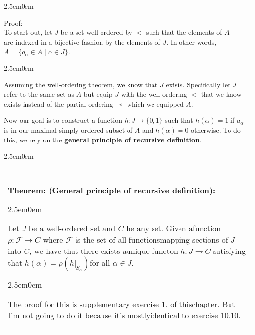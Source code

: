 \documentclass{book}
\newcommand{\hTwo}{%
\color{Black}%
   \fontsize{13}{15}\selectfont%
}
\newcommand{\myComment}{%
   \color{RawerSienna}%
   \fontsize{12}{14}\selectfont%
}
\newenvironment{myIndent}{%
   \begin{adjustwidth}{2.5em}{0em}%
}{%
   \end{adjustwidth}%
}
\newenvironment{myClosureOne}[2][.]{%
   \color{#1}%
   \begin{tabular}{|p{#2in}|} \hline \\%
}{%
   \\ \hline \end{tabular}%
}
\newcommand{\retTwo}{\hfill\bigbreak}
\begin{document}
   \begin{myIndent}\hTwo
      Proof:\\
      To start out, let $J$ be a set well-ordered by $<$ such that the elements of $A$\\ are indexed in a bijective fashion by the elements of $J$. In other words,\\ $A = \{a_\alpha \in A \mid \alpha \in J\}$.
      \begin{myIndent}\myComment
         Assuming the well-ordering theorem, we know that $J$ exists. Specifically let $J$ refer to the same set as $A$ but equip $J$ with the well-ordering $<$ that we know exists instead of the partial ordering $\prec$ which we equipped $A$.\retTwo
      \end{myIndent}

      Now our goal is to construct a function $h: J \longrightarrow \{0, 1\}$ such that $h(\alpha) = 1$ if $a_\alpha$\\ is in our maximal simply ordered subset of $A$ and $h(\alpha) = 0$ otherwise. To do this, we rely on the \textbf{general principle of recursive definition}.\retTwo

      \begin{myIndent}
         \begin{myClosureOne}{5.1}
            \\ [-20pt]\textbf{Theorem: (General principle of recursive definition):}
            
            \begin{myIndent}
               Let $J$ be a well-ordered set and $C$ be any set. Given a\newline function $\rho: \mathcal{F} \longrightarrow C$ where $\mathcal{F}$ is the set of all functions\newline mapping sections of $J$ into $C$, we have that there exists a\newline unique functon $h: J \longrightarrow C$ satisfying that $h(\alpha) = \rho(h|_{S_\alpha})$\newline for all $\alpha \in J$.
               \begin{myIndent}\myComment
                  The proof for this is supplementary exercise 1. of this\newline chapter. But I'm not going to do it because it's mostly\newline identical to exercise 10.10.
               \end{myIndent}
            \end{myIndent}
         \end{myClosureOne}\retTwo
      \end{myIndent}


\end{myIndent}
\end{document}
